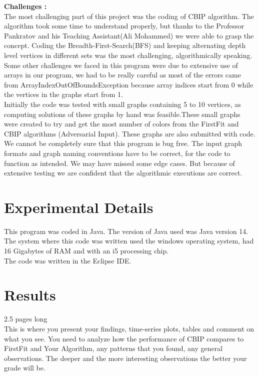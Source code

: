 \documentclass{article}
\begin{document}
\textbf{Challenges :}\\

The most challenging part of this project was the coding of CBIP algorithm. The algorithm took some time to understand properly, but thanks to the
 Professor Pankratov and his Teaching Assistant(Ali Mohammed) we were able to grasp the concept. Coding the Breadth-First-Search(BFS)  
and keeping alternating depth level vertices in different sets was the most challenging, algorithmically speaking. \\

Some other challenges we faced in this program were due to extensive use of arrays in our program, we had to be really careful as most of the errors
 came from ArrayIndexOutOfBoundsException because array indices start from 0 while the vertices in the graphs start from 1.\\

Initially the code was tested with small graphs containing 5 to 10 vertices, as computing solutions of these graphs by hand was feasible.These small
 graphs were created to try and get the most number of colors from the FirstFit and CBIP algorithms (Adversarial Input). These graphs
 are also submitted with code.\\ 

We cannot be completely sure that this program is bug free. The input graph formats and graph naming conventions have to be correct, for the 
code to function as intended. We may have missed some edge cases. But because of extensive testing we are confident that the
 algorithmic executions are correct. 

\section{Experimental Details}

\bigbreak
This program was coded in Java. The version of Java used was Java version 14.\\
The system where this code was written used the windows operating system, had 16 Gigabytes of RAM and with an i5 processing chip. \\
The code was written in the Eclipse IDE. \\


\newpage

\section{Results}
2.5 pages long\\
This is where you present your findings, time-series plots, tables and comment on what you see. You need to analyze how the
performance of CBIP compares to FirstFit and Your Algorithm, any patterns that you found, any general observations. The 
deeper and the more interesting observations the better your grade will be.
\end{document}
